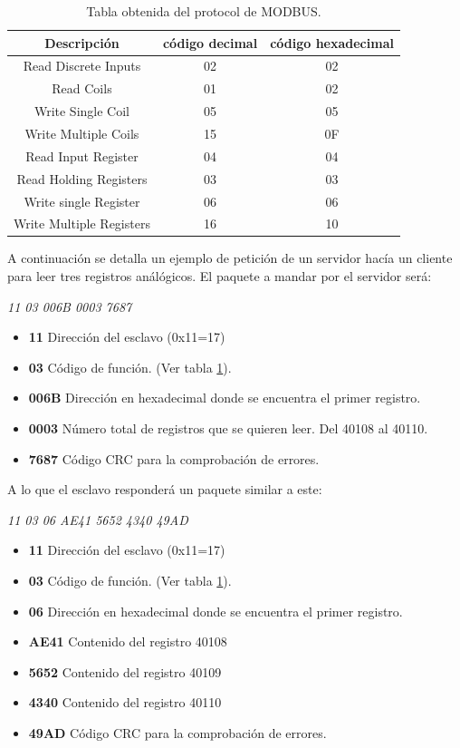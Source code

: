 \begin{table}[!hbt]
  \centering
  \begin{tabular}{|c|c|c|}
    \hline
    Descripción & código decimal & código hexadecimal\\
    \hline
    Read Discrete Inputs & 02  & 02\\
    \hline
    Read Coils & 01  & 02\\
    \hline
    Write Single Coil & 05  & 05\\
    \hline
    Write Multiple Coils & 15  & 0F\\
    \hline
    Read Input Register & 04  & 04\\
    \hline
    Read Holding Registers & 03  & 03\\
    \hline
    Write single Register & 06  & 06\\
    \hline
    Write Multiple Registers & 16  & 10\\
    \hline
  \end{tabular}
  \caption{Tabla obtenida del protocol de MODBUS.}
  \label{tab:funcion_modbus}
\end{table}
A continuación se detalla un ejemplo de petición de un servidor hacía un cliente para leer tres registros análógicos. El paquete a mandar por el servidor será:\\
\begin{center}
    \textit{11 03 006B 0003 7687}
\end{center}
\begin{itemize}
    \item \textbf{11} Dirección del esclavo (0x11=17)
    \item \textbf{03} Código de función. (Ver tabla \ref{tab:funcion_modbus}).
    \item \textbf{006B} Dirección en hexadecimal donde se encuentra el primer registro.
    \item \textbf{0003} Número total de registros que se quieren leer. Del 40108 al 40110.
    \item \textbf{7687} Código CRC para la comprobación de errores.
\end{itemize}
A lo que el esclavo responderá un paquete similar a este:\\
\begin{center}
    \textit{11 03 06 AE41 5652 4340 49AD}
\end{center}
\begin{itemize}
    \item \textbf{11} Dirección del esclavo (0x11=17)
    \item \textbf{03} Código de función. (Ver tabla \ref{tab:funcion_modbus}).
    \item \textbf{06} Dirección en hexadecimal donde se encuentra el primer registro.
    \item \textbf{AE41} Contenido del registro 40108
    \item \textbf{5652} Contenido del registro 40109
    \item \textbf{4340} Contenido del registro 40110
    \item \textbf{49AD} Código CRC para la comprobación de errores.
\end{itemize}

